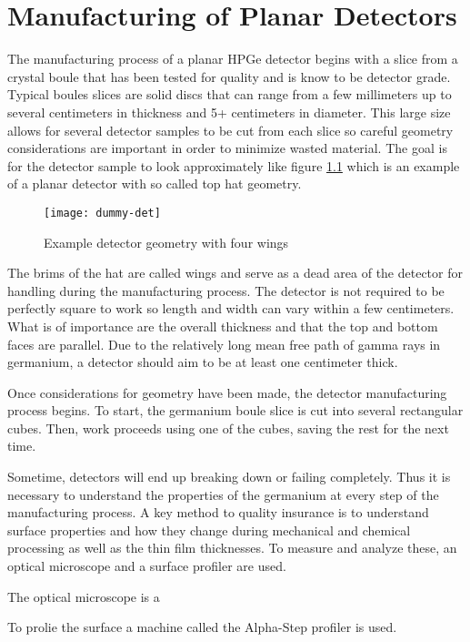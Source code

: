 \chapter{Manufacturing of Planar Detectors}
The manufacturing process of a planar HPGe detector begins with a slice from a crystal boule that has been tested for quality and is know to be detector grade.
Typical boules slices are solid discs that can range from a few millimeters up to several centimeters in thickness and 5+ centimeters in diameter.
This large size allows for several detector samples to be cut from each slice so careful geometry considerations are important in order to minimize wasted material.
The goal is for the detector sample to look approximately like figure \ref{fig:dummydet} which is an example of a planar detector with so called top hat geometry.
\begin{figure}[htpb]
\centering
\texttt{[image: dummy-det]}
\caption{Example detector geometry with four wings}
\label{fig:dummydet}
\end{figure}
The brims of the hat are called wings and serve as a dead area of the detector for handling during the manufacturing process.
The detector is not required to be perfectly square to work so length and width can vary within a few centimeters.
What is of importance are the overall thickness and that the top and bottom faces are parallel.
Due to the relatively long mean free path of gamma rays in germanium, a detector should aim to be at least one centimeter thick.

Once considerations for geometry have been made, the detector manufacturing process begins.
To start, the germanium boule slice is cut into several rectangular cubes.
Then, work proceeds using one of the cubes, saving the rest for the next time.

Sometime, detectors will end up breaking down or failing completely.
Thus it is necessary to understand the properties of the germanium at every step of the manufacturing process.
A key method to quality insurance is to understand surface properties and how they change during mechanical and chemical processing as well as the thin film thicknesses.
To measure and analyze these, an optical microscope and a surface profiler are used.

The optical microscope is a

To prolie the surface a machine called the Alpha-Step profiler is used.


